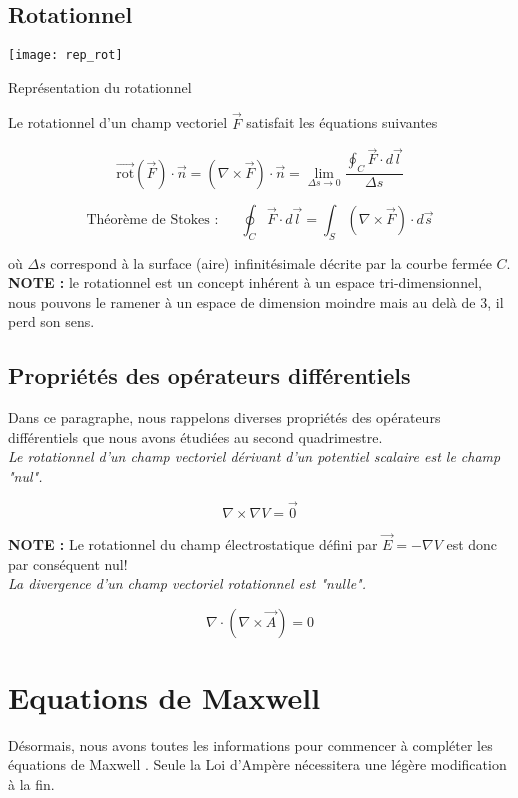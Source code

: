 \subsection{Rotationnel} 
\begin{marginfigure}
	\texttt{[image: rep\_rot]}
	\caption{Représentation du rotationnel}
\end{marginfigure}

Le rotationnel d'un champ vectoriel $\vec{F}$ satisfait les équations suivantes  

\[  \vec{\text{rot}}(\vec{F}) \cdot \vec{n}   = (\nabla \times \vec{F}) \cdot \vec{n} = \lim_{\Delta s \to 0} \frac{\oint_{C} \vec{F} \cdot d\vec{l} }{\Delta s}\]

\[\mbox{Théorème de Stokes : } \hspace{15pt} \oint_{C} \vec{F} \cdot d\vec{l} = \int_{S} (\nabla \times \vec{F}) \cdot d\vec{s}\]

où $\Delta s$ correspond à la surface (aire) infinitésimale décrite par la courbe fermée $C$. \\
\textbf{NOTE : } le rotationnel est un concept inhérent à un espace tri-dimensionnel, nous pouvons le ramener à un espace de dimension moindre 
mais au delà de 3, il perd son sens.

\subsection{Propriétés des opérateurs différentiels}

Dans ce paragraphe, nous rappelons diverses propriétés des opérateurs différentiels que nous avons étudiées au second quadrimestre. 
\\  

\textit{Le rotationnel d'un champ vectoriel dérivant d'un potentiel scalaire est le champ "nul".} 

\[\nabla \times \nabla V = \vec{0} \] 

\textbf{NOTE : } Le rotationnel du champ électrostatique défini par $\vec{E} = -\nabla V$ est donc par conséquent nul!  \\ 

\textit{La divergence d'un champ vectoriel rotationnel est  "nulle".}  

\[\nabla \cdot (\nabla \times \vec{A})  = 0 \]

\section{Equations de Maxwell}
Désormais, nous avons toutes les informations pour commencer à compléter les équations de Maxwell . 
Seule la Loi d'Ampère nécessitera une légère modification à la fin. \\

